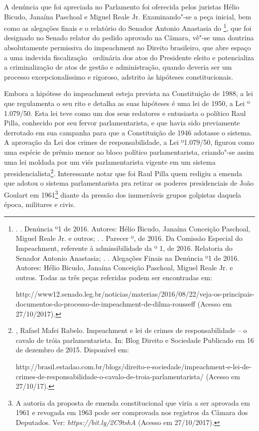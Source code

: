 A denúncia que foi apreciada no Parlamento foi oferecida pelos juristas
Hélio Bicudo, Janaína Paschoal e Miguel Reale Jr. Examinando"-se a peça
inicial, bem como as alegações finais e o relatório do Senador Antonio
Anastasia do \footnote{.   . Denúncia º1 de
  2016. Autores: Hélio Bicudo, Janaína Conceição Paschoal, Miguel Reale
  Jr. e outros; .  . Parecer º, de 2016. Da Comissão
  Especial do Impeachment, referente à admissibilidade da  º 1, de
  2016. Relatoria do Senador Antonio Anastasia; .  .
  Alegações Finais na Denúncia º1 de 2016. Autores: Hélio Bicudo,
  Janaína Conceição Paschoal, Miguel Reale Jr. e outros. Todas as três
  peças referidas podem ser encontradas em:

  http://www12.senado.leg.br/noticias/materias/2016/08/22/veja-os-principais-documentos-do-processo-de-impeachment-de-dilma-rousseff
  (Acesso em 27/10/2017).}, que foi designado no Senado relator do
pedido aprovado na Câmara, vê"-se uma doutrina absolutamente permissiva
do impeachment no Direito brasileiro, que abre espaço a uma indevida
fiscalização~ ordinária dos atos do Presidente eleito e potencializa a
criminalização de atos de gestão e administração, quando deveria ser um
processo excepcionalíssimo e rigoroso, adstrito às hipóteses
constitucionais.

Embora a hipótese do impeachment esteja prevista na Constituição de
1988, a lei que regulamenta o seu rito e detalha as suas hipóteses é uma
lei de 1950, a Lei º 1.079/50. Esta lei teve como um dos seus redatores
e entusiasta o político Raul Pilla, conhecido por seu fervor
parlamentarista, e que havia sido previamente derrotado em sua campanha
para que a Constituição de 1946 adotasse o sistema. A aprovação da Lei
dos crimes de responsabilidade, a Lei º1.079/50, figurou como uma
espécie de prêmio menor ao bloco político parlamentarista, criando"-se
assim uma lei moldada por um viés parlamentarista vigente em um sistema
presidencialista\footnote{, Rafael Mafei Rabelo. Impeachment e
  lei de crimes de responsabilidade -- o cavalo de tróia parlamentarista.
  In: Blog Direito e Sociedade Publicado em 16 de dezembro de 2015.
  Disponível em:

  http://brasil.estadao.com.br/blogs/direito-e-sociedade/impeachment-e-lei-de-crimes-de-responsabilidade-o-cavalo-de-troia-parlamentarista/
  (Acesso em 27/10/17).}. Interessante notar que foi Raul Pilla quem
redigiu a emenda que adotou o sistema parlamentarista pra retirar os
poderes presidenciais de João Goulart em 1961\footnote{A autoria da
  proposta de emenda constitucional que viria a ser aprovada em 1961 e
  revogada em 1963 pode ser comprovada nos registros da Câmara dos
  Deputados. Ver:
  \emph{https://bit.ly/2C9tshA}
  (Acesso em 27/10/2017).} diante da pressão dos inumeráveis grupos
golpistas daquela época, militares e civis.

